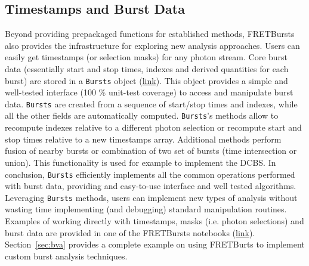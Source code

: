 \subsection{Timestamps and Burst Data}
\label{sec:burststimes}

Beyond providing prepackaged functions for established methods, 
FRETBursts also provides the infrastructure for exploring new analysis approaches.
Users can easily get timestamps (or selection masks) for any photon stream.
Core burst data (essentially start and stop times, indexes 
and derived quantities for each burst) are stored in a \verb|Bursts| object 
(\href{http://fretbursts.readthedocs.org/en/latest/burstsearch.html}{link}).
This object provides a simple and well-tested interface (100 \% unit-test coverage) 
to access and manipulate burst data. \verb|Bursts| are created from a sequence of start/stop 
times and indexes, while all the other fields are automatically
computed. \verb|Bursts|'s methods allow to recompute indexes relative to a different photon
selection or recompute start and stop times relative to a new timestamps array.
Additional methods perform fusion of nearby bursts or combination of two set of bursts 
(time intersection or union). This functionality is used for example to implement 
the DCBS.
In conclusion, \verb|Bursts| efficiently implements all the common operations performed 
with burst data, providing and easy-to-use interface and well tested algorithms. 
Leveraging \verb|Bursts| methods, users can implement new types of analysis without 
wasting time implementing (and debugging) standard manipulation routines.
Examples of working directly with timestamps, masks (i.e. photon selections) and 
burst data are provided in one of the FRETBursts notebooks (\href{http://nbviewer.jupyter.org/github/tritemio/FRETBursts_notebooks/blob/master/notebooks/Example%20-%20Working%20with%20timestamps%20and%20bursts.ipynb}{link}). 
Section~\ref{sec:bva} provides a complete example on using FRETBurts to implement 
custom burst analysis techniques.


